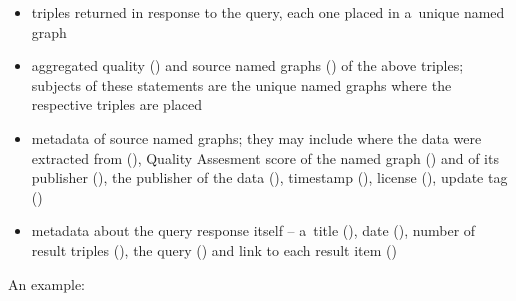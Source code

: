 \begin{itemize}
	\item triples returned in response to the query, each one placed in a~unique named graph
  \item aggregated quality () and source named graphs () of the above triples; subjects of these statements are the unique named graphs where the respective triples are placed
  \item  metadata of source named graphs; they may include where the data were extracted from (), Quality Assesment score of the named graph () and of its publisher (), the publisher of the data (), timestamp (), license (), update tag ()
  \item  metadata about the query response itself -- a~title (), date (), number of result triples (), the query () and link to each result item ()
\end{itemize}

\pagebreak[3]

An example:

